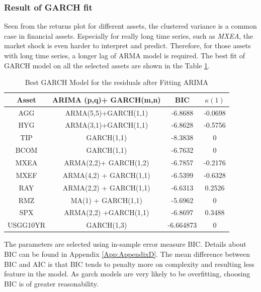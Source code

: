 \documentclass[11pt]{article}
\begin{document}
\subsubsection{Result of GARCH fit}
Seen from the returns plot for different assets, the clustered variance is a common case in financial assets. Especially for really long time series, such as \textit{MXEA}, the market shock is even harder to interpret and predict. Therefore, for those assets with long time series, a longer lag of ARMA model is required. The best fit of GARCH model on all the selected assets are shown in the Table \ref{table:BestGarch}.
\begin{table}[!h]
\caption{Best GARCH Model for the residuals after Fitting ARIMA}
\centering 
\begin{tabular}{ | c || c | c | c|} 
 \hline
Asset & ARIMA (p,q)+ GARCH(m,n) & BIC & $\kappa(1)$\\
  \hline \hline
AGG & ARMA(5,5)+GARCH(1,1) & -6.8688 & -0.0698\\ 
HYG & ARMA(3,1)+GARCH(1,1) & -6.8628 & -0.5756\\ 
TIP &  GARCH(1,1)&-8.3838 & 0\\ 
BCOM & GARCH(1,1)&-6.7632 &0\\ 
MXEA & ARMA(2,2)+ GARCH(1,2) &-6.7857 & -0.2176\\ 
MXEF & ARMA(4,2) + GARCH(1,1)&-6.5399 & -0.6328\\ 
RAY &  ARMA(2,2) + GARCH(1,1)&-6.6313 & 0.2526\\ 
RMZ & MA(1) + GARCH(1,1)&-5.6962 & 0 \\ 
SPX & ARMA(2,2) +GARCH(1,1)&-6.8697& 0.3488\\ 
USGG10YR & GARCH(1,3) &-6.664873& 0\\
 \hline
\end{tabular}
\label{table:BestGarch}
\end{table}
The parameters are selected using in-sample error measure BIC. Details about BIC can be found in Appendix \ref{App:AppendixD}. The mean difference between BIC and AIC is that BIC tends to penalty more on complexity and resulting less feature in the model. As garch models are very likely to be overfitting, choosing BIC is of greater reasonability.
\end{document}
